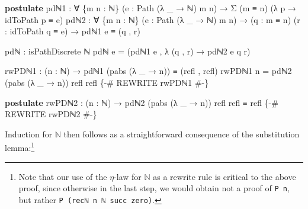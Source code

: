 \documentclass[
  12pt]{article}
\newenvironment{Shaded}{\begin{snugshade}}{\end{snugshade}}
\newcommand{\KeywordTok}[1]{\textcolor[rgb]{0.12,0.11,0.11}{\textbf{#1}}}
\newcommand{\NormalTok}[1]{\textcolor[rgb]{0.12,0.11,0.11}{#1}}
\newcommand{\OtherTok}[1]{\textcolor[rgb]{0.00,0.43,0.16}{#1}}
\newcommand{\PreprocessorTok}[1]{\textcolor[rgb]{0.00,0.43,0.16}{#1}}
\begin{document}
\begin{Shaded}
\begin{Highlighting}[]
\KeywordTok{postulate}
\NormalTok{    pdℕ1 }\OtherTok{:} \OtherTok{∀} \OtherTok{\{}\NormalTok{m n }\OtherTok{:}\NormalTok{ ℕ}\OtherTok{\}} \OtherTok{(}\NormalTok{e }\OtherTok{:}\NormalTok{ Path }\OtherTok{(λ} \OtherTok{\_} \OtherTok{→}\NormalTok{ ℕ}\OtherTok{)}\NormalTok{ m n}\OtherTok{)} 
           \OtherTok{→}\NormalTok{ Σ }\OtherTok{(}\NormalTok{m ≡ n}\OtherTok{)} \OtherTok{(λ}\NormalTok{ p }\OtherTok{→}\NormalTok{ idToPath p ≡ e}\OtherTok{)}
\NormalTok{    pdℕ2 }\OtherTok{:} \OtherTok{∀} \OtherTok{\{}\NormalTok{m n }\OtherTok{:}\NormalTok{ ℕ}\OtherTok{\}} \OtherTok{(}\NormalTok{e }\OtherTok{:}\NormalTok{ Path }\OtherTok{(λ} \OtherTok{\_} \OtherTok{→}\NormalTok{ ℕ}\OtherTok{)}\NormalTok{ m n}\OtherTok{)}
           \OtherTok{→} \OtherTok{(}\NormalTok{q }\OtherTok{:}\NormalTok{ m ≡ n}\OtherTok{)} \OtherTok{(}\NormalTok{r }\OtherTok{:}\NormalTok{ idToPath q ≡ e}\OtherTok{)}
           \OtherTok{→}\NormalTok{ pdℕ1 e ≡ }\OtherTok{(}\NormalTok{q , r}\OtherTok{)}

\NormalTok{pdℕ }\OtherTok{:}\NormalTok{ isPathDiscrete ℕ}
\NormalTok{pdℕ e }\OtherTok{=} \OtherTok{(}\NormalTok{pdℕ1 e , }\OtherTok{λ} \OtherTok{(}\NormalTok{q , r}\OtherTok{)} \OtherTok{→}\NormalTok{ pdℕ2 e q r}\OtherTok{)}

\NormalTok{rwPDℕ1 }\OtherTok{:} \OtherTok{(}\NormalTok{n }\OtherTok{:}\NormalTok{ ℕ}\OtherTok{)} \OtherTok{→}\NormalTok{ pdℕ1 }\OtherTok{(}\NormalTok{pabs }\OtherTok{(λ} \OtherTok{\_} \OtherTok{→}\NormalTok{ n}\OtherTok{))}\NormalTok{ ≡ }\OtherTok{(}\NormalTok{refl , refl}\OtherTok{)}
\NormalTok{rwPDℕ1 n }\OtherTok{=}\NormalTok{ pdℕ2 }\OtherTok{(}\NormalTok{pabs }\OtherTok{(λ} \OtherTok{\_} \OtherTok{→}\NormalTok{ n}\OtherTok{))}\NormalTok{ refl refl}
\PreprocessorTok{\{{-}\# REWRITE rwPDℕ1 \#{-}\}}

\KeywordTok{postulate}
\NormalTok{    rwPDℕ2 }\OtherTok{:} \OtherTok{(}\NormalTok{n }\OtherTok{:}\NormalTok{ ℕ}\OtherTok{)} \OtherTok{→}\NormalTok{ pdℕ2 }\OtherTok{(}\NormalTok{pabs }\OtherTok{(λ} \OtherTok{\_} \OtherTok{→}\NormalTok{ n}\OtherTok{))}\NormalTok{ refl refl ≡ refl}
    \PreprocessorTok{\{{-}\# REWRITE rwPDℕ2 \#{-}\}}
\end{Highlighting}
\end{Shaded}

Induction for \(\mathbb{N}\) then follows as a straightforward
consequence of the substitution lemma:\footnote{Note that our use of the
  \(\eta\)-law for \(\mathbb{N}\) as a rewrite rule is critical to the
  above proof, since otherwise in the last step, we would obtain not a
  proof of \texttt{P\ n}, but rather
  \texttt{P\ (recℕ\ n\ ℕ\ succ\ zero)}.}
\end{document}
